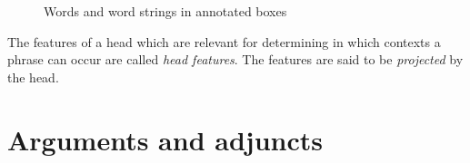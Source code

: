 {\begin{figure}
\caption{\label{Abbildung-ausfuehrlich-beschriftete-Schachteln}Words and word strings in annotated boxes}
\end{figure}%

The features of a head which are relevant for determining in which contexts a phrase can occur are called \emph{head features}.
The features are said to be \emph{projected} by the head.



\section{Arguments and adjuncts}
\label{sec-intro-arg-adj}
\label{Abschnitt-Argument-Adjunkt}
\label{Abschnitt-Valenz}

}
